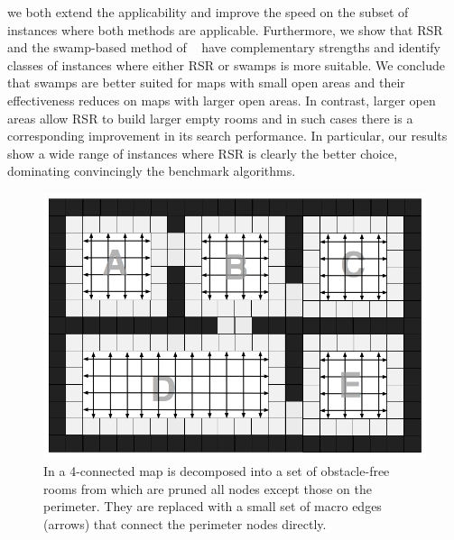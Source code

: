 we both extend the applicability and improve the speed
on the subset of instances where both methods are applicable.
Furthermore, we show that RSR and the swamp-based method of 
\citeauthor{pochter10}~
have complementary strengths and identify classes of instances where
either RSR or swamps is more suitable.
We conclude that swamps are better suited for maps with
small open areas and their effectiveness reduces on maps with larger open areas.
In contrast, larger open areas allow RSR to build larger empty rooms and in such
cases there is a corresponding improvement in its search performance.
In particular, our results show a wide range of instances where
RSR is clearly the better choice, dominating convincingly the benchmark algorithms.




\begin{figure}[tb]
       \begin{center}
                       \includegraphics[scale=0.30, trim = 10mm 10mm 10mm 0mm]{diagrams/overview.png}
       \end{center}
	\vspace{-3pt}
       \caption{In \cite{harabor10} a 4-connected map is decomposed into a set of obstacle-free rooms from which are pruned all nodes except those on the perimeter.
				They are replaced with a small set of macro edges (arrows) that connect the perimeter nodes directly.}
       \label{fig-overview}
\end{figure}

